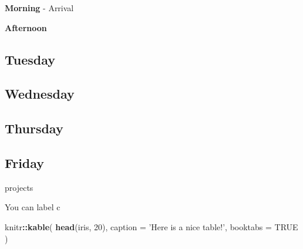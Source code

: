 \documentclass[
]{book}
\newenvironment{Shaded}{\begin{snugshade}}{\end{snugshade}}
\newcommand{\DataTypeTok}[1]{\textcolor[rgb]{0.13,0.29,0.53}{#1}}
\newcommand{\DecValTok}[1]{\textcolor[rgb]{0.00,0.00,0.81}{#1}}
\newcommand{\KeywordTok}[1]{\textcolor[rgb]{0.13,0.29,0.53}{\textbf{#1}}}
\newcommand{\NormalTok}[1]{#1}
\newcommand{\OperatorTok}[1]{\textcolor[rgb]{0.81,0.36,0.00}{\textbf{#1}}}
\newcommand{\OtherTok}[1]{\textcolor[rgb]{0.56,0.35,0.01}{#1}}
\newcommand{\StringTok}[1]{\textcolor[rgb]{0.31,0.60,0.02}{#1}}
\begin{document}
\textbf{Morning} - Arrival

\textbf{Afternoon}

\hypertarget{tuesday}{%
\subsection{Tuesday}\label{tuesday}}

\hypertarget{wednesday}{%
\subsection{Wednesday}\label{wednesday}}

\hypertarget{thursday}{%
\subsection{Thursday}\label{thursday}}

\hypertarget{friday}{%
\subsection{Friday}\label{friday}}

projects

You can label c

\begin{Shaded}
\begin{Highlighting}[]
\NormalTok{knitr}\OperatorTok{::}\KeywordTok{kable}\NormalTok{(}
  \KeywordTok{head}\NormalTok{(iris, }\DecValTok{20}\NormalTok{), }\DataTypeTok{caption =} \StringTok{'Here is a nice table!'}\NormalTok{,}
  \DataTypeTok{booktabs =} \OtherTok{TRUE}
\NormalTok{)}
\end{Highlighting}
\end{Shaded}
\end{document}
